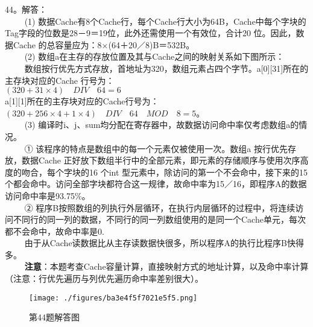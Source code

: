 44。解答：\\
$\qquad$ (1) 数据Cache有8个Cache行，每个Cache行大小为64B，Cache中每个字块的Tag字段的位数是28－9＝19位，此外还需使用一个有效位，合计20 位。因此，数据Cache 的总容量应为：8×(64＋20／8)B＝532B。\\
$\qquad$ (2) 数组a在主存的存放位置及其与Cache之间的映射关系如下图所示：\\
$\qquad$ 数组按行优先方式存放，首地址为320，数组元素占四个字节。a[0][31]所在的主存块对应的Cache 行号为：\\
$(320 + 31 \times 4) \quad DIV \quad 64 = 6$ \\
a[1][1]所在的主存块对应的Cache行号为： \\
$(320 + 256 \times 4 + 1 \times 4) \quad DIV \quad 64 \quad MOD \quad 8 = 5 $。 \\
$\qquad$ (3) 编译时i、j、sum均分配在寄存器中，故数据访问命中率仅考虑数组a的情况。 \\
$\qquad$ ① 该程序的特点是数组中的每一个元素仅被使用一次。数组a 按行优先存放，数据Cache 正好放下数组半行中的全部元素，即元素的存储顺序与使用次序高度的吻合，每个字块的16 个int 型元素中，除访问的第一个不会命中，接下来的15 个都会命中。访问全部字块都符合这一规律，故命中率为15／16，即程序A的数据访问命中率是93.75\%。 \\
$\qquad$ ② 程序B按照数组的列执行外层循环，在执行内层循环的过程中，将连续访问不同行的同一列的数据，不同行的同一列数组使用的是同一个Cache单元，每次都不会命中，故命中率是0. \\
$\qquad$ 由于从Cache读数据比从主存读数据快很多，所以程序A的执行比程序B快得多。\\
$\qquad$ \textbf{注意}：本题考查Cache容量计算，直接映射方式的地址计算，以及命中率计算（注意：行优先遍历与列优先遍历命中率差别很大）。
\begin{figure}[ht]
\centering
\texttt{[image: ./figures/ba3e4f5f7021e5f5.png]}
\caption{第44题解答图} \label{fig_CSN10_10}
\end{figure}

